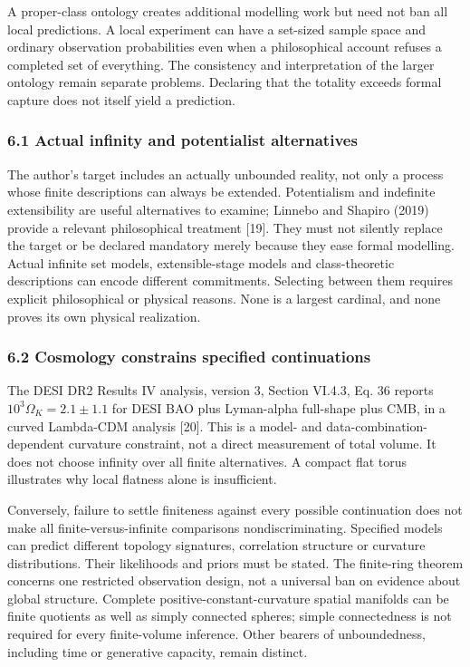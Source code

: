 \documentclass[
  10pt,
  a4paper,
]{article}
\begin{document}
A proper-class ontology creates additional modelling work but need not
ban all local predictions. A local experiment can have a set-sized
sample space and ordinary observation probabilities even when a
philosophical account refuses a completed set of everything. The
consistency and interpretation of the larger ontology remain separate
problems. Declaring that the totality exceeds formal capture does not
itself yield a prediction.

\subsubsection{6.1 Actual infinity and potentialist
alternatives}\label{actual-infinity-and-potentialist-alternatives}

The author's target includes an actually unbounded reality, not only a
process whose finite descriptions can always be extended. Potentialism
and indefinite extensibility are useful alternatives to examine; Linnebo
and Shapiro (2019) provide a relevant philosophical treatment {[}19{]}.
They must not silently replace the target or be declared mandatory
merely because they ease formal modelling. Actual infinite set models,
extensible-stage models and class-theoretic descriptions can encode
different commitments. Selecting between them requires explicit
philosophical or physical reasons. None is a largest cardinal, and none
proves its own physical realization.

\subsubsection{6.2 Cosmology constrains specified
continuations}\label{cosmology-constrains-specified-continuations}

The DESI DR2 Results IV analysis, version 3, Section VI.4.3, Eq. 36
reports \(10^3\Omega_K=2.1\pm1.1\) for DESI BAO plus Lyman-alpha
full-shape plus CMB, in a curved Lambda-CDM analysis {[}20{]}. This is a
model- and data-combination-dependent curvature constraint, not a direct
measurement of total volume. It does not choose infinity over all finite
alternatives. A compact flat torus illustrates why local flatness alone
is insufficient.

Conversely, failure to settle finiteness against every possible
continuation does not make all finite-versus-infinite comparisons
nondiscriminating. Specified models can predict different topology
signatures, correlation structure or curvature distributions. Their
likelihoods and priors must be stated. The finite-ring theorem concerns
one restricted observation design, not a universal ban on evidence about
global structure. Complete positive-constant-curvature spatial manifolds
can be finite quotients as well as simply connected spheres; simple
connectedness is not required for every finite-volume inference. Other
bearers of unboundedness, including time or generative capacity, remain
distinct.
\end{document}
